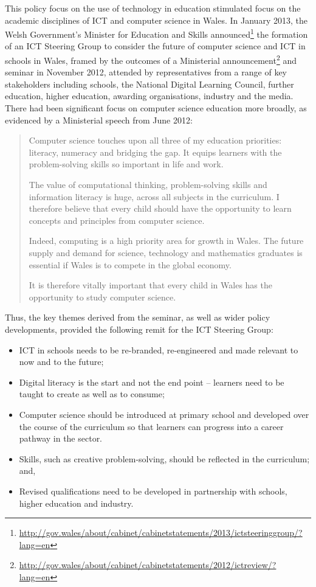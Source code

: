 \documentclass{sig-alternate}
\begin{document}
This policy focus on the use of technology in education stimulated
focus on the academic disciplines of ICT and computer science in
Wales. In January 2013, the Welsh Government's Minister for Education
and Skills
announced\footnote{\url{http://gov.wales/about/cabinet/cabinetstatements/2013/ictsteeringgroup/?lang=en}}
the formation of an ICT Steering Group to consider the future of
computer science and ICT in schools in Wales, framed by the outcomes
of a Ministerial
announcement\footnote{\url{http://gov.wales/about/cabinet/cabinetstatements/2012/ictreview/?lang=en}}
and seminar in November 2012, attended by representatives from a range
of key stakeholders including schools, the National Digital Learning
Council, further education, higher education, awarding organisations,
industry and the media. There had been significant focus on computer
science education more broadly, as evidenced by a Ministerial speech
from June 2012:

\begin{quotation}
Computer science touches upon all three of my education priorities:
literacy, numeracy and bridging the gap. It equips learners with the
problem-solving skills so important in life and work.

The value of computational thinking, problem-solving skills and
information literacy is huge, across all subjects in the curriculum. I
therefore believe that every child should have the opportunity to
learn concepts and principles from computer science.

Indeed, computing is a high priority area for growth in Wales. The
future supply and demand for science, technology and mathematics
graduates is essential if Wales is to compete in the global economy.

It is therefore vitally important that every child in Wales has the
opportunity to study computer science.
\end{quotation}

Thus, the key themes derived from the seminar, as well as wider policy
developments, provided the following remit for the ICT Steering Group:

\begin{itemize}
\item ICT in schools needs to be re-branded, re-engineered and made
relevant to now and to the future;
\item Digital literacy is the start and not the end point -- learners
need to be taught to create as well as to consume;
\item Computer science should be introduced at primary school and
developed over the course of the curriculum so that learners can
progress into a career pathway in the sector.
\item Skills, such as creative problem-solving, should be reflected in
the curriculum; and,
\item Revised qualifications need to be developed in partnership with
schools, higher education and industry.
\end{itemize}
\end{document}
